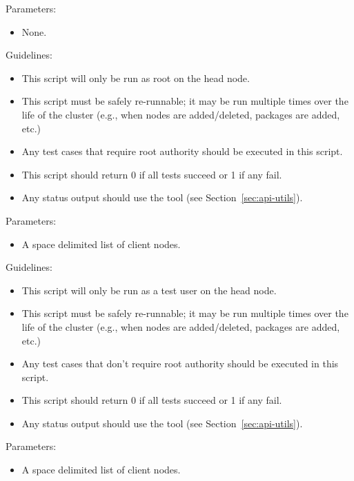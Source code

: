\begin{itemize}
  Parameters:
  
  \begin{itemize}
  \item None.
  \end{itemize}


  Guidelines:
  \begin{itemize}
  \item This script will only be run as root on the head node.
  \item This script must be safely re-runnable; it may be run multiple
    times over the life of the cluster (e.g., when nodes are
    added/deleted, packages are added, etc.)
  \item Any test cases that require root authority should be executed
    in this script.
  \item This script should return 0 if all tests succeed or 1 if any
    fail.
  \item Any status output should use the  tool
    (see Section~\ref{sec:api-utils}).
  \end{itemize}

  Parameters:
  
  \begin{itemize}
  \item A space delimited list of client nodes.
  \end{itemize}


  Guidelines:
  \begin{itemize}
  \item This script will only be run as a test user on the head node.
  \item This script must be safely re-runnable; it may be run multiple
    times over the life of the cluster (e.g., when nodes are
    added/deleted, packages are added, etc.)
  \item Any test cases that don't require root authority should be executed
    in this script.
  \item This script should return 0 if all tests succeed or 1 if any
    fail.
  \item Any status output should use the  tool
    (see Section~\ref{sec:api-utils}).
  \end{itemize}

  Parameters:
  
  \begin{itemize}
  \item A space delimited list of client nodes.
  \end{itemize}

\end{itemize}

